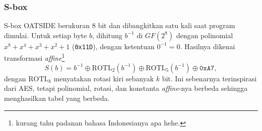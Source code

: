 \subsubsection{S-box}
S-box OATSIDE berukuran 8 bit dan dibangkitkan satu kali saat program dimulai. Untuk setiap byte $b$, dihitung $b^{-1}$ di $GF(2^8)$ dengan polinomial $x^8 + x^4 + x^3 + x^2 + 1$ (\texttt{0x11D}), dengan ketentuan $0^{-1} = 0$. Hasilnya dikenai transformasi \textit{affine}\footnote{kurang tahu padanan bahasa Indonesianya apa hehe.}
\[ S(b) = b^{-1} \oplus \mathrm{ROTL}_2(b^{-1}) \oplus \mathrm{ROTL}_5(b^{-1}) \oplus \texttt{0xA7}, \]
dengan $\mathrm{ROTL}_k$ menyatakan rotasi kiri sebanyak $k$ bit. Ini sebenarnya terinspirasi dari AES, tetapi polinomial, rotasi, dan konstanta \textit{affine}-nya berbeda sehingga menghasilkan tabel yang berbeda.

